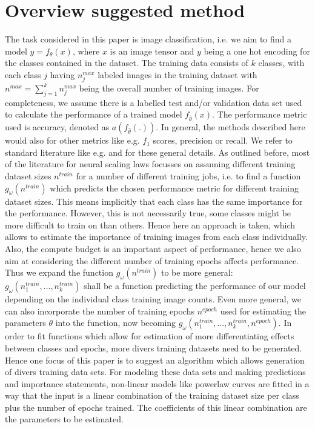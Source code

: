 \documentclass{article} %
\begin{document}
\section{Overview suggested method}

The task considered in this paper is image classification, i.e. we aim to find a model $y = f_{\theta}(x)$, where $x$ is an image tensor and $y$ being a one hot encoding for the classes contained in the dataset.
The training data consists of $k$ classes, with each class $j$ having $n_j^{max}$ labeled images in the training dataset with $n^{max} = \sum_{j= 1}^k n_j^{max}$ being the overall number of training images.
For completeness, we assume there is a labelled test and/or validation data set used to calculate the performance of a trained model $f_{\hat{\theta}}(x)$.
The performance metric used is accuracy, denoted as $a(f_{\hat{\theta}}(.))$. In general, the methods described here would also for other metrics like e.g. $f_1$ scores, precision or recall.
We refer to standard literature like e.g. \cite{Goodfellowetal2016} and \cite{Bishop2006PatternRecog} for these general details.
As outlined before, most of the literature for neural scaling laws focusses on assuming different training dataset sizes $n^{train}$ for a number of different training jobs, i.e. to find a function $g_{\omega}(n^{train})$ which predicts the chosen performance metric for different training dataset sizes.
This means implicitly that each class has the same importance for the performance.
However, this is not necessarily true, some classes might be more difficult to train on than others.
Hence here an approach is taken, which allows to estimate the importance of training images from each class individually.
Also, the compute budget is an important aspect of performance, hence we also aim at considering the different number of training epochs affects performance.
Thus we expand the function $g_{\omega}(n^{train})$ to be more general: $g_{\omega}(n_1^{train}, \dots, n_k^{train})$ shall be a function predicting the performance of our model depending on the individual class training image counts.
Even more general, we can also incorporate the number of training epochs $n^{epoch}$ used for estimating the parameters $\theta$ into the function, now becoming $g_{\omega}(n_1^{train}, \dots, n_k^{train}, n^{epoch})$.
In order to fit functions which allow for estimation of more differentiating effects between classes and epochs, more divers training datasets need to be generated.
Hence one focus of this paper is to suggest an algorithm which allows generation of divers training data sets.
For modeling these data sets and making predictions and importance statements, non-linear models like powerlaw curves are fitted in a way that the input is a linear combination of the training dataset size per class plus the number of epochs trained.
The coefficients of this linear combination are the parameters to be estimated.
\end{document}
